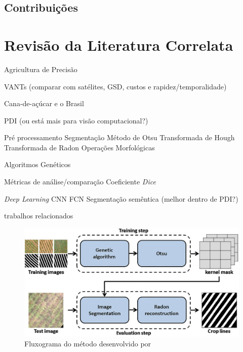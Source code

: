 \documentclass[12pt, a4paper, english, brazil]{article}
\newcommand{\textRed}[1]{{{\color{red} #1}}}
\newcommand{\textBlue}[1]{{{\color{blue} #1}}}
\begin{document}
\subsection{Contribuições}

\section{Revisão da Literatura Correlata}
\textBlue{
Agricultura de Precisão

VANTs (comparar com satélites, GSD, custos e rapidez/temporalidade)

Cana-de-açúcar e o Brasil

PDI (ou está mais para visão computacional?)

    Pré processamento
    Segmentação
    Método de Otsu
    Transformada de Hough
    Transformada de Radon
    Operações Morfológicas

Algoritmos Genéticos

Métricas de análise/comparação
    Coeficiente \textit{Dice}

\textit{Deep Learning}
    CNN
    FCN
    Segmentação semêntica (melhor dentro de PDI?)
}


\bigskip
\textRed{trabalhos relacionados}
\bigskip

\begin{figure}[htbp]
    \centering
    \includegraphics[width=0.6\textheight]{img/2021_Silva_flow_chart.png}
    \caption{Fluxograma do método desenvolvido por  }
    \label{fig:2021_silva_flow_chart}
\end{figure}
\end{document}
